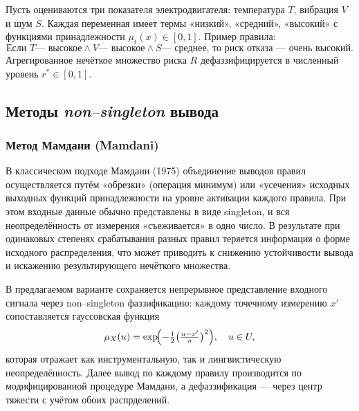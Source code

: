 \begin{example}
Пусть оцениваются три показателя электродвигателя: температура $T$, вибрация $V$ и шум $S$.  
Каждая переменная имеет термы «низкий», «средний», «высокий» с функциями принадлежности $\mu_{t}(x)\in[0,1]$.  
Пример правила:
\[
  \text{Если }T\text{— высокое}\land V\text{— высокое}\land S\text{— среднее,}
  \text{ то риск отказа — очень высокий}.
\]
Агрегированное нечёткое множество риска $R$ дефаззифицируется в численный уровень $r^*\in[0,1]$.
\end{example}

\subsection{Методы \emph{non--singleton} вывода}

\label{subsec:other_defuzz}

\subsubsection{Метод Мамдани (Mamdani)}
\label{sec:mamdani}

В классическом подходе Мамдани (1975) объединение выводов правил осуществляется путём «обрезки» (операция минимум) или «усечения» исходных выходных функций принадлежности на уровне активации каждого правила. При этом входные данные обычно представлены в виде singleton, и вся неопределённость от измерения «съеживается» в одно число. В результате при одинаковых степенях срабатывания разных правил теряется информация о форме исходного распределения, что может приводить к снижению устойчивости вывода и искажению результирующего нечёткого множества.

В предлагаемом варианте сохраняется непрерывное представление входного сигнала через non–singleton фаззификацию: каждому точечному измерению $x'$ сопоставляется гауссовская функция
\[
  \mu_X(u)
  = \exp\!\Bigl(-\tfrac12\bigl(\tfrac{u - x'}{\sigma}\bigr)^2\Bigr), 
  \quad u\in U,
\]
которая отражает как инструментальную, так и лингвистическую неопределённость. Далее вывод по каждому правилу производится по модифицированной процедуре Мамдани, а дефаззификация — через центр тяжести с учётом обоих распрделений.

